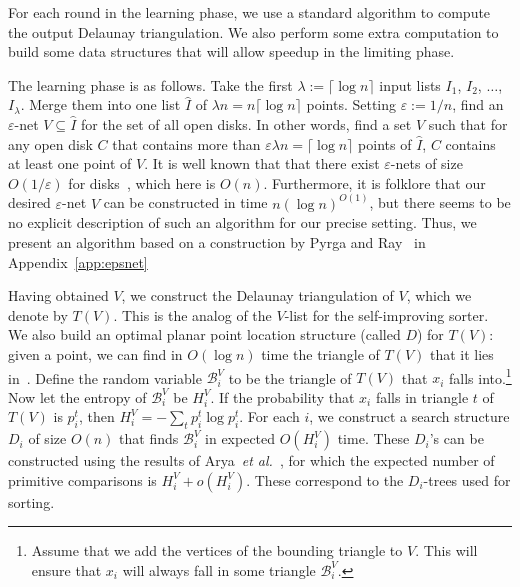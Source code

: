 \documentclass{siamltex}
\newcommand{\eps}{\varepsilon}
\newcommand{\etal}{\emph{et al.}}
\newcommand{\tsearch}{\mathcal{B}}
\newcommand{\eqdef}{:=}
\begin{document}
For each round in the learning phase, we use a standard algorithm
to compute the output Delaunay triangulation. We also
perform some extra computation to build some
data structures that will allow speedup in the limiting phase.

The learning phase is as follows. Take the first
$\lambda \eqdef \lceil\log n\rceil$ input lists
$I_1$, $I_2$, $\ldots$, $I_\lambda$. 
Merge them into one list $\hat I$ 
of $\lambda n =  n\lceil\log n\rceil$ points. Setting $\eps \eqdef 1/n$, 
find an $\eps$-net $V\subseteq \hat I$ for the set of all open disks. In 
other words, find a set $V$ such that for any open disk $C$ that
contains more than $\eps \lambda n = \lceil \log n\rceil$ points
of $\hat I$, $C$ contains at least one point of $V$. 
It is well known that that there exist $\eps$-nets of
size $O(1/\eps)$ for disks~\cite{CV,MSW,Matousek92,PyrgaRa08},
which here is $O(n)$.
Furthermore, it is folklore that 
our desired $\eps$-net $V$ can be constructed in time
$n (\log n)^{O(1)}$, but there seems to
be no explicit description of such an algorithm 
for our precise setting. Thus, we present 
an algorithm based on a construction by
Pyrga and Ray~\cite{PyrgaRa08} in Appendix~\ref{app:epsnet}

Having obtained $V$, we construct the Delaunay triangulation of $V$,
which we denote by $T(V)$. 
This is the analog of the $V$-list for
the self-improving sorter.
We also build an optimal
planar point location structure (called $D$) for $T(V)$:
given a point, we can find in $O(\log n)$ time the triangle of $T(V)$ that
it lies in~\cite[Chapter~6]{deBergKrOvSc00}. Define the random variable 
$\tsearch_i^V$ to be the triangle of $T(V)$ that $x_i$ falls 
into.\footnote{Assume that we add the vertices of the bounding triangle to $V$.
This will ensure that $x_i$ will always fall in some triangle $\tsearch_i^V$.}
Now let the entropy of $\tsearch_i^V$ be $H^V_i$.
If the probability that $x_i$ falls in triangle $t$ of $T(V)$ is $p^t_i$,
then $H^V_i = -\sum_t p^t_i \log p^t_i$. 
For each $i$, we construct a search structure $D_i$ of size $O(n)$
that finds $\tsearch_i^V$ in expected $O(H^V_i)$ time.
These $D_i$'s can be constructed using 
the results of Arya~\etal~\cite{AMM}, for which the expected number
of primitive comparisons is $H^V_i + o(H^V_i)$.
These correspond to the $D_i$-trees used
for sorting.
\end{document}
